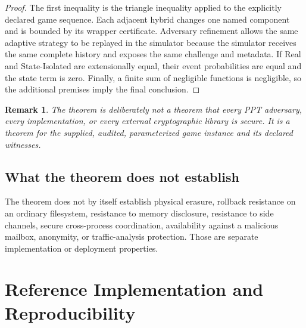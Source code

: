 \documentclass[11pt,letterpaper]{article}
\newtheorem{remark}[definition]{Remark}
\begin{document}
\begin{proof}
The first inequality is the triangle inequality applied to the explicitly declared game
sequence. Each adjacent hybrid changes one named component and is bounded by its wrapper
certificate. Adversary refinement allows the same adaptive strategy to be replayed in the
simulator because the simulator receives the same complete history and exposes the same
challenge and metadata. If Real and State-Isolated are extensionally equal, their event
probabilities are equal and the state term is zero. Finally, a finite sum of negligible
functions is negligible, so the additional premises imply the final conclusion.
\end{proof}

\begin{remark}
The theorem is deliberately not a theorem that every PPT adversary, every implementation,
or every external cryptographic library is secure. It is a theorem for the supplied,
audited, parameterized game instance and its declared witnesses.
\end{remark}

\subsection{What the theorem does not establish}

The theorem does not by itself establish physical erasure, rollback resistance on an
ordinary filesystem, resistance to memory disclosure, resistance to side channels, secure
cross-process coordination, availability against a malicious mailbox, anonymity, or
traffic-analysis protection. Those are separate implementation or deployment properties.

\section{Reference Implementation and Reproducibility}
\label{sec:reproducibility}
\end{document}
